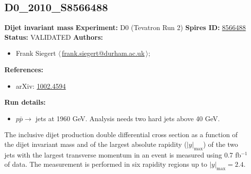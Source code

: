\subsection[D0\_2010\_S8566488]{D0\_2010\_S8566488\,\cite{Abazov:2010fr}}
\textbf{Dijet invariant mass}\newline
\textbf{Experiment:} D0 (Tevatron Run 2) \newline
\textbf{Spires ID:} \href{http://www.slac.stanford.edu/spires/find/hep/www?rawcmd=key+8566488}{8566488}\newline
\textbf{Status:} VALIDATED\newline
\textbf{Authors:}
\begin{itemize}
  \item Frank Siegert $\langle\,$\href{mailto:frank.siegert@durham.ac.uk}{frank.siegert@durham.ac.uk}$\,\rangle$;
\end{itemize}
\textbf{References:}
\begin{itemize}
  \item arXiv: \href{http://arxiv.org/abs/1002.4594}{1002.4594}
\end{itemize}
\textbf{Run details:}
\begin{itemize}

  \item $p \bar{p} \to$ jets at 1960 GeV. Analysis needs two hard jets above 40 GeV.\end{itemize}

\noindent The inclusive dijet production double differential cross section as a function of the dijet invariant mass and of the largest absolute rapidity ($|y|_\text{max}$) of the two jets with the largest transverse momentum in an event is measured using 0.7 fb$^{-1}$ of data. The measurement is performed in six rapidity regions up to $|y|_\text{max}=2.4$.

\clearpage


\clearpage

